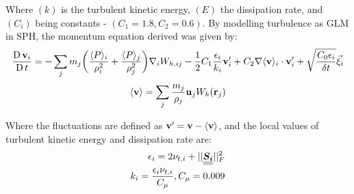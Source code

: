 Where $(k)$ is the turbulent kinetic energy, $(E)$ the dissipation rate, and $(C_i)$ being constants - $(C_1=1.8, C_2=0.6)$.
By modelling turbulence as GLM in SPH, the momentum equation derived was given by:
\begin{equation}
	\frac{\operatorname{D} \mathbf{v}_i}{\operatorname{D} t} = -\sum_j m_j \bigg( \frac{\langle P \rangle_i}{\rho_i^2} + \frac{\langle P \rangle_j}{\rho_j^2} \bigg) \nabla_{i} W_{h, ij} - \frac{1}{2} C_1 \frac{\epsilon_i}{k_i} \mathbf{v}'_i + C_2 \nabla \langle \mathbf{v} \rangle_i \cdot \mathbf{v}'_i + \sqrt{\frac{C_0 \epsilon_i}{\delta t}} \Vec{\xi}_i
	\label{eq:violeau-mom-glm}
\end{equation}
\begin{equation}
	\langle \mathbf{v} \rangle = \sum_j \frac{m_j}{\rho_j}\mathbf{u}_j W_h (\mathbf{r}_j)
	\label{eq:violeau-ra-vel}
\end{equation}

Where the fluctuations are defined as $\mathbf{v}' = \mathbf{v} - \langle \mathbf{v} \rangle$, and the local values of turbulent kinetic energy and dissipation rate are:
\begin{align}
	\epsilon_i = 2 \nu_{t, i} + 
	||\underline{\underline{\bm{S_i}}}||_F^2 \\
	k_i = \frac{\epsilon_i \nu_{t, i}}{C_{\mu}}, C_{\mu} = 0.009
	\label{eq:violeau-k-eps}
\end{align}

